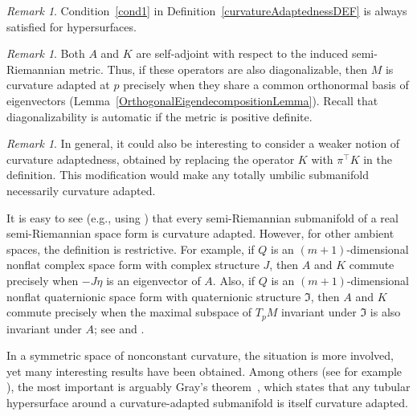 \documentclass[a4paper,12pt,oneside]{amsart}
\theoremstyle{plain}
\theoremstyle{remark}
\newtheorem{remark}[theorem]{Remark}
\theoremstyle{definition}
\begin{document}
\begin{remark}
Condition~\ref{cond1} in Definition~\ref{curvatureAdaptednessDEF} is always satisfied for hypersurfaces.
\end{remark}

\begin{remark}
Both $A$ and $K$ are self-adjoint with respect to the induced semi-Riemannian metric. Thus, if these operators are also diagonalizable, then $M$ is curvature adapted at $p$ precisely when they share a common orthonormal basis of eigenvectors (Lemma~\ref{OrthogonalEigendecompositionLemma}). Recall that diagonalizability is automatic if the metric is positive definite.
\end{remark}

\begin{remark}
In general, it could also be interesting to consider a weaker notion of curvature adaptedness, obtained by replacing the operator $K$ with $\pi^{\top}K$ in the definition. This modification would make any totally umbilic submanifold necessarily curvature adapted.
\end{remark}

It is easy to see (e.g., using \cite[Lemma~2]{graves1978}) that every semi-Riemannian submanifold of a real semi-Riemannian space form is curvature adapted. However, for other ambient spaces, the definition is restrictive. For example, if $Q$ is an $(m+1)$-dimensional nonflat complex space form with complex structure $J$, then $A$ and $K$ commute precisely when $-J\eta$ is an eigenvector of $A$. Also, if $Q$ is an $(m+1)$-dimensional nonflat quaternionic space form with quaternionic structure $\mathfrak{I}$, then $A$ and $K$ commute precisely when the maximal subspace of $T_{p}M$ invariant under $\mathfrak{I}$ is also invariant under $A$; see \cite{berndt1991} and \cite[sec.~9.8]{cecil2015}.

In a symmetric space of nonconstant curvature, the situation is more involved, yet many interesting results have been obtained. Among others (see for example \cite{koike2005, murphy2012, koike2014-1, koike2014-2}), the most important is arguably Gray's theorem~\cite[Theorem~6.14]{gray2004}, which states that any tubular hypersurface around a curvature-adapted submanifold is itself curvature adapted.
\end{document}
